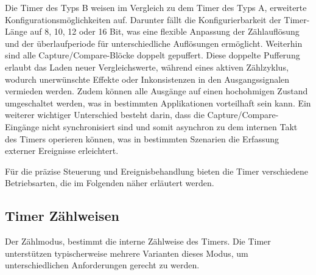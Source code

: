 Die Timer des Typs B weisen im Vergleich zu dem Timer des Typs A, erweiterte Konfigurationsm\"oglichkeiten auf. Darunter f\"allt die Konfigurierbarkeit der Timer-L\"ange auf 8, 10, 12 oder 16 Bit, was eine flexible Anpassung der Z\"ahlaufl\"osung und der \"uberlaufperiode f\"ur unterschiedliche Aufl\"osungen erm\"oglicht. Weiterhin sind alle Capture/Compare-Bl\"ocke doppelt gepuffert. Diese doppelte Pufferung erlaubt das Laden neuer Vergleichswerte, w\"ahrend eines aktiven Z\"ahlzyklus, wodurch unerw\"unschte Effekte oder Inkonsistenzen in den Ausgangssignalen vermieden werden. Zudem k\"onnen alle Ausg\"ange auf einen hochohmigen Zustand umgeschaltet werden, was in bestimmten Applikationen vorteilhaft sein kann. Ein weiterer wichtiger Unterschied besteht darin, dass die Capture/Compare-Eing\"ange nicht synchronisiert sind und somit asynchron zu dem internen Takt des Timers operieren k\"onnen, was in bestimmten Szenarien die Erfassung externer Ereignisse erleichtert. 

F\"ur die pr\"azise Steuerung und Ereignisbehandlung bieten die Timer verschiedene Betriebsarten, die im Folgenden n\"aher erl\"autert werden.

\newpage
\subsection{Timer Z\"ahlweisen}
\label{sec:Timer_CountMode}

Der Z\"ahlmodus, bestimmt die interne Z\"ahlweise des Timers. Die Timer unterst\"utzen typischerweise mehrere Varianten dieses Modus, um unterschiedlichen Anforderungen gerecht zu werden. 

